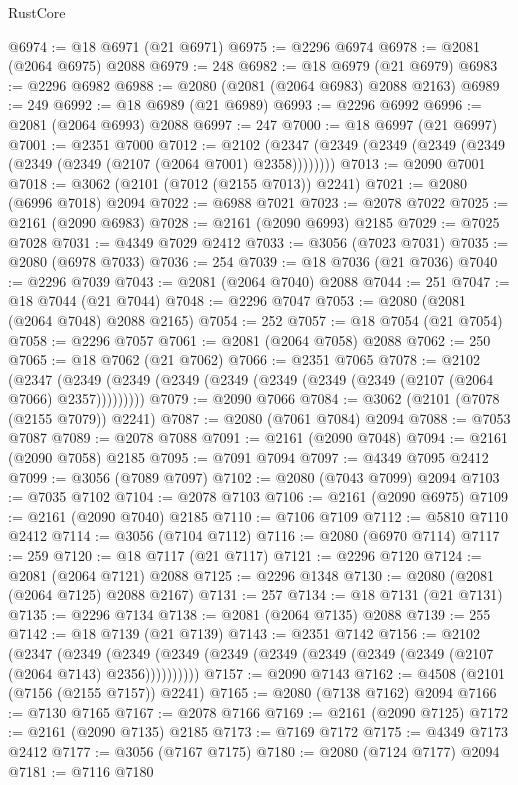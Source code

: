 \begin{lexlean}{RustCore}
\begin{coremodule}
@6974 := @18 @6971 (@21 @6971)
@6975 := @2296 @6974
@6978 := @2081 (@2064 @6975) @2088
@6979 := 248
@6982 := @18 @6979 (@21 @6979)
@6983 := @2296 @6982
@6988 := @2080 (@2081 (@2064 @6983) @2088 @2163)
@6989 := 249
@6992 := @18 @6989 (@21 @6989)
@6993 := @2296 @6992
@6996 := @2081 (@2064 @6993) @2088
@6997 := 247
@7000 := @18 @6997 (@21 @6997)
@7001 := @2351 @7000
@7012 := @2102 (@2347 (@2349 (@2349 (@2349 (@2349 (@2349 (@2349 (@2107 (@2064 @7001) @2358))))))))
@7013 := @2090 @7001
@7018 := @3062 (@2101 (@7012 (@2155 @7013)) @2241)
@7021 := @2080 (@6996 @7018) @2094
@7022 := @6988 @7021
@7023 := @2078 @7022
@7025 := @2161 (@2090 @6983)
@7028 := @2161 (@2090 @6993) @2185
@7029 := @7025 @7028
@7031 := @4349 @7029 @2412
@7033 := @3056 (@7023 @7031)
@7035 := @2080 (@6978 @7033)
@7036 := 254
@7039 := @18 @7036 (@21 @7036)
@7040 := @2296 @7039
@7043 := @2081 (@2064 @7040) @2088
@7044 := 251
@7047 := @18 @7044 (@21 @7044)
@7048 := @2296 @7047
@7053 := @2080 (@2081 (@2064 @7048) @2088 @2165)
@7054 := 252
@7057 := @18 @7054 (@21 @7054)
@7058 := @2296 @7057
@7061 := @2081 (@2064 @7058) @2088
@7062 := 250
@7065 := @18 @7062 (@21 @7062)
@7066 := @2351 @7065
@7078 := @2102
    (@2347 (@2349 (@2349 (@2349 (@2349 (@2349 (@2349 (@2349 (@2107 (@2064 @7066) @2357)))))))))
@7079 := @2090 @7066
@7084 := @3062 (@2101 (@7078 (@2155 @7079)) @2241)
@7087 := @2080 (@7061 @7084) @2094
@7088 := @7053 @7087
@7089 := @2078 @7088
@7091 := @2161 (@2090 @7048)
@7094 := @2161 (@2090 @7058) @2185
@7095 := @7091 @7094
@7097 := @4349 @7095 @2412
@7099 := @3056 (@7089 @7097)
@7102 := @2080 (@7043 @7099) @2094
@7103 := @7035 @7102
@7104 := @2078 @7103
@7106 := @2161 (@2090 @6975)
@7109 := @2161 (@2090 @7040) @2185
@7110 := @7106 @7109
@7112 := @5810 @7110 @2412
@7114 := @3056 (@7104 @7112)
@7116 := @2080 (@6970 @7114)
@7117 := 259
@7120 := @18 @7117 (@21 @7117)
@7121 := @2296 @7120
@7124 := @2081 (@2064 @7121) @2088
@7125 := @2296 @1348
@7130 := @2080 (@2081 (@2064 @7125) @2088 @2167)
@7131 := 257
@7134 := @18 @7131 (@21 @7131)
@7135 := @2296 @7134
@7138 := @2081 (@2064 @7135) @2088
@7139 := 255
@7142 := @18 @7139 (@21 @7139)
@7143 := @2351 @7142
@7156 := @2102
    (@2347
      (@2349 (@2349 (@2349 (@2349 (@2349 (@2349 (@2349 (@2349 (@2107 (@2064 @7143) @2356))))))))))
@7157 := @2090 @7143
@7162 := @4508 (@2101 (@7156 (@2155 @7157)) @2241)
@7165 := @2080 (@7138 @7162) @2094
@7166 := @7130 @7165
@7167 := @2078 @7166
@7169 := @2161 (@2090 @7125)
@7172 := @2161 (@2090 @7135) @2185
@7173 := @7169 @7172
@7175 := @4349 @7173 @2412
@7177 := @3056 (@7167 @7175)
@7180 := @2080 (@7124 @7177) @2094
@7181 := @7116 @7180

\end{coremodule}
\end{lexlean}

